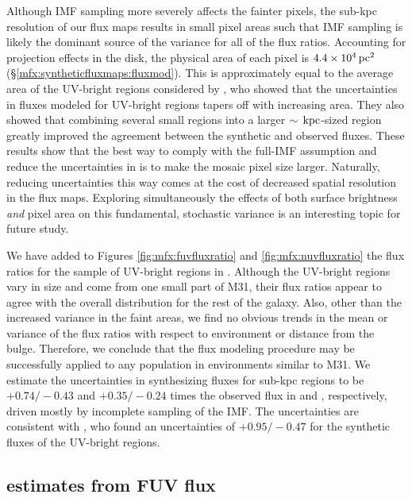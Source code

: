 \documentclass[iop, tighten]{emulateapj}
\begin{document}
Although IMF sampling more severely affects the fainter pixels, the sub-kpc
resolution of our flux maps results in small pixel areas such that IMF sampling
is likely the dominant source of the variance for all of the flux ratios.
Accounting for projection effects in the disk, the physical area of each pixel
is $4.4\times 10^4\,\mathrm{pc}^2$ (\S \ref{mfx:syntheticfluxmaps:fluxmod}). This is
approximately equal to the average area of the UV-bright regions considered by
\citet{Simones:2014}, who showed that the uncertainties in fluxes modeled for
UV-bright regions tapers off with increasing area. They also showed that
combining several small regions into a larger $\sim\,\mathrm{kpc}$-sized region greatly
improved the agreement between the synthetic and observed fluxes. These results
show that the best way to comply with the full-IMF assumption and reduce the
uncertainties in \fxsfh{} is to make the mosaic pixel size larger. Naturally,
reducing uncertainties this way comes at the cost of decreased spatial
resolution in the flux maps. Exploring simultaneously the effects of both
surface brightness \emph{and} pixel area on this fundamental, stochastic
variance is an interesting topic for future study.

We have added to Figures \ref{fig:mfx:fuvfluxratio} and
\ref{fig:mfx:nuvfluxratio} the flux ratios for the sample of UV-bright regions
in \citet{Simones:2014}. Although the UV-bright regions vary in size and come
from one small part of M31, their flux ratios appear to agree with the overall
distribution for the rest of the galaxy. Also, other than the increased
variance in the faint areas, we find no obvious trends in the mean or variance
of the flux ratios with respect to environment or distance from the bulge.
Therefore, we conclude that the flux modeling procedure may be successfully
applied to any population in environments similar to M31. We estimate the
uncertainties in synthesizing fluxes for sub-kpc regions to be
$+\!0.74/\!-\!0.43$ and $+\!0.35/\!-\!0.24$ times the observed flux in \fuv{}
and \nuv{}, respectively, driven mostly by incomplete sampling of the IMF. The
\ffuvsfh{} uncertainties are consistent with \citet{Simones:2014}, who found an
uncertainties of $+\!0.95/\!-\!0.47$ for the synthetic \fuv{} fluxes of the
UV-bright regions.



\subsection{\sfr{} estimates from FUV flux}
\end{document}

